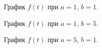 \documentclass[a5paper, 10pt]{article}
\theoremstyle{definition}
\theoremstyle{plain}
\theoremstyle{remark}
\begin{document}
\begin{figure}[h!]
\caption{График $f(t)$ при $a = 1$, $b = 1$.}
\end{figure}


\begin{figure}[h!]
\caption{График $f(t)$ при $a = 1$, $b = 5$.}
\caption{График $f(t)$ при $a = 5$, $b = 1$.}
\end{figure}
\end{document}
